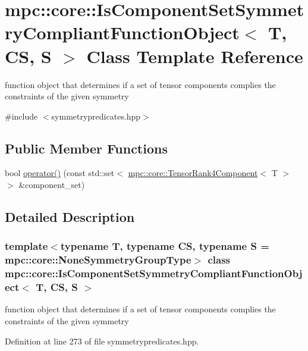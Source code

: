 \hypertarget{structmpc_1_1core_1_1_is_component_set_symmetry_compliant_function_object}{}\section{mpc\+:\+:core\+:\+:Is\+Component\+Set\+Symmetry\+Compliant\+Function\+Object$<$ T, CS, S $>$ Class Template Reference}
\label{structmpc_1_1core_1_1_is_component_set_symmetry_compliant_function_object}


function object that determines if a set of tensor components complies the constraints of the given symmetry  




{\ttfamily \#include $<$symmetrypredicates.\+hpp$>$}

\subsection*{Public Member Functions}
\begin{DoxyCompactItemize}
\item 
bool \mbox{\hyperlink{structmpc_1_1core_1_1_is_component_set_symmetry_compliant_function_object_aecd6c223463d118f66d8d3a8f094fd9b}{operator()}} (const std\+::set$<$ \mbox{\hyperlink{namespacempc_1_1core_ac3a232afc7c680d580628e834030482f}{mpc\+::core\+::\+Tensor\+Rank4\+Component}}$<$ T $>$ $>$ \&component\+\_\+set)
\end{DoxyCompactItemize}


\subsection{Detailed Description}
\subsubsection*{template$<$typename T, typename CS, typename S = mpc\+::core\+::\+None\+Symmetry\+Group\+Type$>$\newline
class mpc\+::core\+::\+Is\+Component\+Set\+Symmetry\+Compliant\+Function\+Object$<$ T, C\+S, S $>$}

function object that determines if a set of tensor components complies the constraints of the given symmetry 

Definition at line 273 of file symmetrypredicates.\+hpp.



